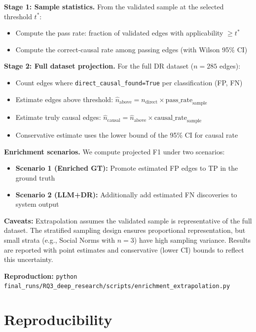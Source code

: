 \textbf{Stage 1: Sample statistics.} From the validated sample at the selected threshold $t^*$:
\begin{itemize}[noitemsep]
    \item Compute the pass rate: fraction of validated edges with applicability $\geq t^*$
    \item Compute the correct-causal rate among passing edges (with Wilson 95\% CI)
\end{itemize}

\textbf{Stage 2: Full dataset projection.} For the full DR dataset ($n=285$ edges):
\begin{itemize}[noitemsep]
    \item Count edges where \texttt{direct\_causal\_found=True} per classification (FP, FN)
    \item Estimate edges above threshold: $\hat{n}_{\text{above}} = n_{\text{direct}} \times \text{pass\_rate}_{\text{sample}}$
    \item Estimate truly causal edges: $\hat{n}_{\text{causal}} = \hat{n}_{\text{above}} \times \text{causal\_rate}_{\text{sample}}$
    \item Conservative estimate uses the lower bound of the 95\% CI for causal rate
\end{itemize}

\textbf{Enrichment scenarios.} We compute projected F1 under two scenarios:
\begin{itemize}[noitemsep]
    \item \textbf{Scenario 1 (Enriched GT):} Promote estimated FP edges to TP in the ground truth
    \item \textbf{Scenario 2 (LLM+DR):} Additionally add estimated FN discoveries to system output
\end{itemize}

\textbf{Caveats:} Extrapolation assumes the validated sample is representative of the full dataset. The stratified sampling design ensures proportional representation, but small strata (e.g., Social Norms with $n=3$) have high sampling variance. Results are reported with point estimates and conservative (lower CI) bounds to reflect this uncertainty.

\textbf{Reproduction:} \texttt{python final\_runs/RQ3\_deep\_research/scripts/enrichment\_extrapolation.py}

\section{Reproducibility}
\label{sec:reproduction}


